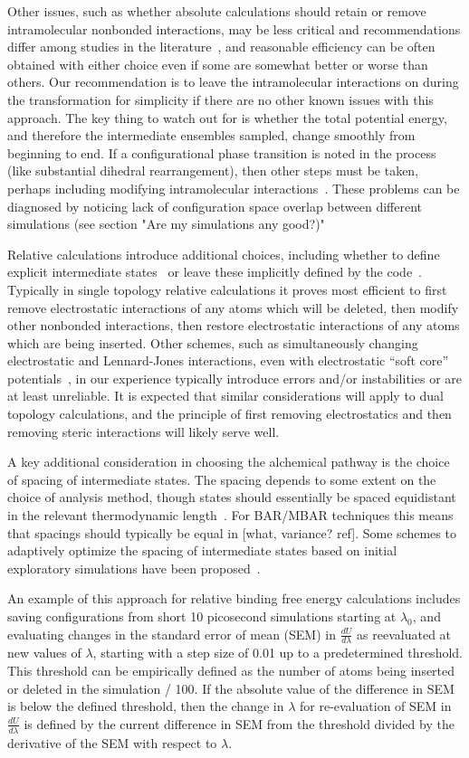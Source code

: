 \documentclass[9pt,bestpractices]{livecoms}
\begin{document}
Other issues, such as whether absolute calculations should retain or remove intramolecular nonbonded interactions, may be less critical and recommendations differ among studies in the literature~\cite{}, and reasonable efficiency can be often obtained with either choice even if some are somewhat better or worse than others. Our recommendation is to leave the intramolecular interactions on during the transformation for simplicity if there are no other known issues with this approach.  The key thing to watch out for is whether the total potential energy, and therefore the intermediate ensembles sampled, change smoothly from beginning to end.  If a configurational phase transition is noted in the process (like substantial dihedral rearrangement), then other steps must be taken, perhaps including modifying intramolecular interactions~\cite{???}.  These problems can be diagnosed by noticing lack of configuration space overlap between different simulations (see section "Are my simulations any good?)" 

Relative calculations introduce additional choices, including whether to define explicit intermediate states~\cite{} or leave these implicitly defined by the code~\cite{}.
Typically in single topology relative calculations it proves most efficient to first remove electrostatic interactions of any atoms which will be deleted, then modify other nonbonded interactions, then restore electrostatic interactions of any atoms which are being inserted.
Other schemes, such as simultaneously changing electrostatic and Lennard-Jones interactions, even with electrostatic ``soft core'' potentials~\cite{Steinbrecher:JCC:2011}, in our experience typically introduce errors and/or instabilities or are at least unreliable.
It is expected that similar considerations will apply to dual topology calculations, and the principle of first removing electrostatics and then removing steric interactions will likely serve well.

A key additional consideration in choosing the alchemical pathway is the choice of spacing of intermediate states.
The spacing depends to some extent on the choice of analysis method, though states should essentially be spaced equidistant in the relevant thermodynamic length~\cite{}.
For BAR/MBAR techniques this means that spacings should typically be equal in [what, variance? ref].
Some schemes to adaptively optimize the spacing of intermediate states based on initial exploratory simulations have been proposed~\cite{}.

An example of this approach for relative binding free energy calculations includes saving configurations from short 10 picosecond simulations starting at $\lambda_0$, and evaluating changes in the standard error of mean (SEM) in $\frac{dU}{d\lambda}$ as reevaluated at new values of $\lambda$, starting with a step size of 0.01 up to a predetermined threshold.
This threshold can be empirically defined as the number of atoms being inserted or deleted in the simulation / 100.
If the absolute value of the difference in SEM is below the defined threshold, then the change in $\lambda$ for re-evaluation of SEM in $\frac{dU}{d\lambda}$ is defined by the current difference in SEM from the threshold divided by the derivative of the SEM with respect to $\lambda$.
\end{document}
